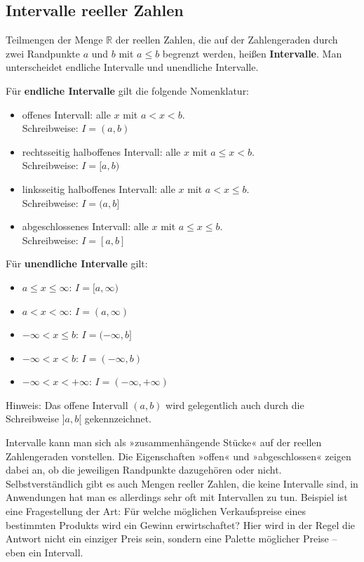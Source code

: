 \subsection{Intervalle reeller Zahlen}

Teilmengen der Menge $\mathbb{R}$ der reellen Zahlen, die auf der Zahlengeraden durch zwei Randpunkte $a$ und $b$ mit $a \leq b$ begrenzt werden, heißen \textbf{Intervalle}. Man unterscheidet endliche Intervalle und unendliche Intervalle.

Für \textbf{endliche Intervalle} gilt die folgende Nomenklatur:
\begin{itemize}
  \item offenes Intervall: alle $x$ mit $a < x < b$.\\
  Schreibweise: $I = (a,b)$
  \item rechtsseitig halboffenes Intervall: alle $x$ mit $a \leq x < b$.\\
  Schreibweise: $I = [a,b)$
  \item linksseitig halboffenes Intervall: alle $x$ mit $a < x \leq b$.\\
  Schreibweise: $I = (a,b]$
  \item abgeschlossenes Intervall: alle $x$ mit $a \leq x \leq b$.\\
  Schreibweise: $I = [a,b]$
\end{itemize}

Für \textbf{unendliche Intervalle} gilt:
\begin{itemize}
  \item $a \leq x \leq \infty$: $I = [a,\infty)$
  \item $a < x < \infty$: $I = (a,\infty)$
  \item $-\infty < x \leq b$: $I = (-\infty,b]$
  \item $-\infty < x < b$: $I = (-\infty,b)$
  \item $-\infty < x < +\infty$: $I = (-\infty,+\infty)$
\end{itemize}

Hinweis: Das offene Intervall $(a,b)$ wird gelegentlich auch durch die Schreibweise $]a,b[$ gekennzeichnet.

Intervalle kann man sich als »zusammenhängende Stücke« auf der reellen Zahlengeraden vorstellen. Die Eigenschaften »offen« und »abgeschlossen« zeigen dabei an, ob die jeweiligen Randpunkte dazugehören oder nicht. Selbstverständlich gibt es auch Mengen reeller Zahlen, die keine Intervalle sind, in Anwendungen hat man es allerdings sehr oft mit Intervallen zu tun. Beispiel ist eine Fragestellung der Art: Für welche möglichen Verkaufspreise eines bestimmten Produkts wird ein Gewinn erwirtschaftet? Hier wird in der Regel die Antwort nicht ein einziger Preis sein, sondern eine Palette möglicher Preise -- eben ein Intervall.

